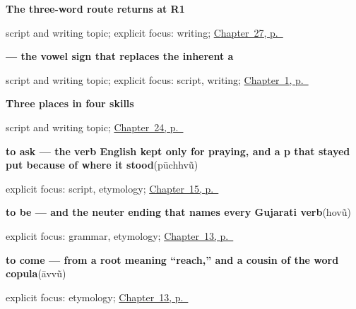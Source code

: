 \noindent\begin{minipage}[t]{\linewidth}
\raggedright
\textbf{The three-word route returns at R1}\par
\footnotesize script and writing topic; explicit focus: writing; \hyperref[ch:gu-village-shop-ten]{Chapter~27, p.~\pageref*{ch:gu-village-shop-ten}}
\end{minipage}\par\smallskip

\noindent\begin{minipage}[t]{\linewidth}
\raggedright
\textbf{ — the vowel sign that replaces the inherent a}\par
\footnotesize script and writing topic; explicit focus: script, writing; \hyperref[ch:first-greeting-script]{Chapter~1, p.~\pageref*{ch:first-greeting-script}}
\end{minipage}\par\smallskip

\noindent\begin{minipage}[t]{\linewidth}
\raggedright
\textbf{Three places in four skills}\par
\footnotesize script and writing topic; \hyperref[ch:gu-first-three-places]{Chapter~24, p.~\pageref*{ch:gu-first-three-places}}
\end{minipage}\par\smallskip

\noindent\begin{minipage}[t]{\linewidth}
\raggedright
\textbf{to ask — the verb English kept only for praying, and a p that stayed put because of where it stood}\enspace\emph{}\enspace(pūchhvũ)\par
\footnotesize explicit focus: script, etymology; \hyperref[ch:gu-doing-verbs]{Chapter~15, p.~\pageref*{ch:gu-doing-verbs}}
\end{minipage}\par\smallskip

\noindent\begin{minipage}[t]{\linewidth}
\raggedright
\textbf{to be — and the neuter ending that names every Gujarati verb}\enspace\emph{}\enspace(hovũ)\par
\footnotesize explicit focus: grammar, etymology; \hyperref[ch:gu-core-verbs]{Chapter~13, p.~\pageref*{ch:gu-core-verbs}}
\end{minipage}\par\smallskip

\noindent\begin{minipage}[t]{\linewidth}
\raggedright
\textbf{to come — from a root meaning “reach,” and a cousin of the word copula}\enspace\emph{}\enspace(āvvũ)\par
\footnotesize explicit focus: etymology; \hyperref[ch:gu-core-verbs]{Chapter~13, p.~\pageref*{ch:gu-core-verbs}}
\end{minipage}\par\smallskip

